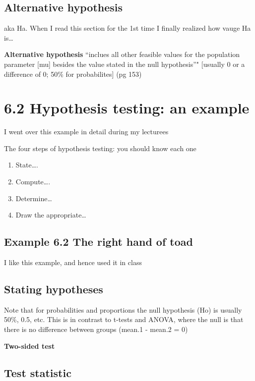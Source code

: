 \documentclass[]{book}
\providecommand{\tightlist}{%
  \setlength{\itemsep}{0pt}\setlength{\parskip}{0pt}}
\theoremstyle{definition}
\theoremstyle{definition}
\theoremstyle{definition}
\theoremstyle{remark}
\begin{document}
\subsection{Alternative hypothesis}\label{alternative-hypothesis}

aka Ha. When I read this section for the 1st time I finally realized how
vauge Ha is\ldots{}

\textbf{Alternative hypothesis} ``inclues all other feasible values for
the population parameter {[}mu{]} besides the value stated in the null
hypothesis''" {[}usually 0 or a difference of 0; 50\% for
probabilites{]} (pg 153)

\section{6.2 Hypothesis testing: an
example}\label{hypothesis-testing-an-example}

I went over this example in detail during my lecturees

The four steps of hypothesis testing: you should know each one

\begin{enumerate}
\def\labelenumi{\arabic{enumi}.}
\tightlist
\item
  State\ldots{}.
\item
  Compute\ldots{}.
\item
  Determine\ldots{}
\item
  Draw the appropriate\ldots{}
\end{enumerate}

\subsection{Example 6.2 The right hand of
toad}\label{example-6.2-the-right-hand-of-toad}

I like this example, and hence used it in class

\subsection{Stating hypotheses}\label{stating-hypotheses}

Note that for probabilities and proportions the null hypothesis (Ho) is
usually 50\%, 0.5, etc. This is in contrast to t-tests and ANOVA, where
the null is that there is no difference between groups (mean.1 - mean.2
= 0)

\textbf{Two-sided test}

\subsection{Test statistic}\label{test-statistic}
\end{document}
